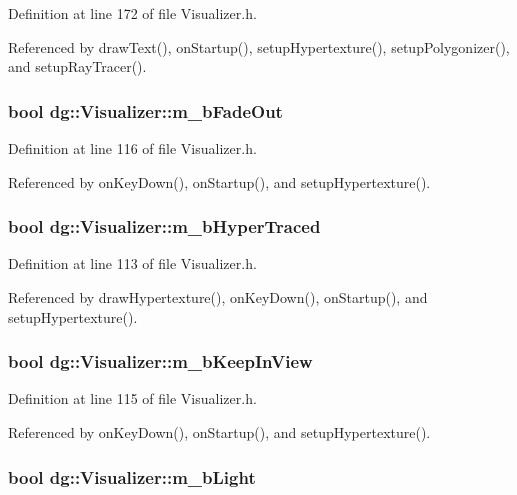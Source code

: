 Definition at line 172 of file Visualizer.h.

Referenced by draw\-Text(), on\-Startup(), setup\-Hypertexture(), setup\-Polygonizer(), and setup\-Ray\-Tracer().
\subsubsection{\setlength{\rightskip}{0pt plus 5cm}bool dg::Visualizer::m\_\-b\-Fade\-Out\hspace{0.3cm}{\tt  [protected]}}\label{classdg_1_1Visualizer_n18}




Definition at line 116 of file Visualizer.h.

Referenced by on\-Key\-Down(), on\-Startup(), and setup\-Hypertexture().
\subsubsection{\setlength{\rightskip}{0pt plus 5cm}bool dg::Visualizer::m\_\-b\-Hyper\-Traced\hspace{0.3cm}{\tt  [protected]}}\label{classdg_1_1Visualizer_n15}




Definition at line 113 of file Visualizer.h.

Referenced by draw\-Hypertexture(), on\-Key\-Down(), on\-Startup(), and setup\-Hypertexture().
\subsubsection{\setlength{\rightskip}{0pt plus 5cm}bool dg::Visualizer::m\_\-b\-Keep\-In\-View\hspace{0.3cm}{\tt  [protected]}}\label{classdg_1_1Visualizer_n17}




Definition at line 115 of file Visualizer.h.

Referenced by on\-Key\-Down(), on\-Startup(), and setup\-Hypertexture().
\subsubsection{\setlength{\rightskip}{0pt plus 5cm}bool dg::Visualizer::m\_\-b\-Light\hspace{0.3cm}{\tt  [protected]}}\label{classdg_1_1Visualizer_n12}




